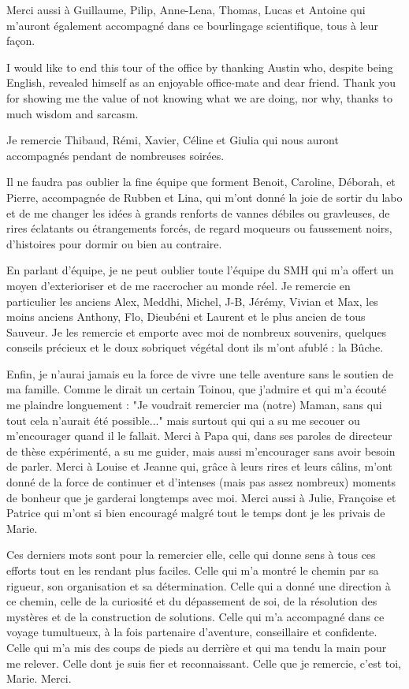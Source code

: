 \documentclass[a4paper, notoc, justified,marginals=left, nobib]{tufte-book}
\begin{document}
\begin{fullwidth}
Merci aussi à Guillaume, Pilip, Anne-Lena, Thomas, Lucas et Antoine qui m'auront également accompagné dans ce bourlingage scientifique, tous à leur façon.

I would like to end this tour of the office by thanking Austin who, despite being English, revealed himself as an enjoyable office-mate and dear friend. Thank you for showing me the value of not knowing what we are doing, nor why, thanks to much wisdom and sarcasm.

Je remercie Thibaud, Rémi, Xavier, Céline et Giulia qui  nous auront accompagnés pendant de nombreuses soirées.

Il ne faudra pas oublier la fine équipe que forment Benoit, Caroline, Déborah, et Pierre, accompagnée de Rubben et Lina, qui m'ont donné la joie de sortir du labo et de me changer les idées à grands renforts de vannes débiles ou gravleuses, de rires éclatants ou étrangements forcés, de regard moqueurs ou faussement noirs, d'histoires pour dormir ou bien au contraire.

En parlant d'équipe, je ne peut oublier toute l'équipe du SMH qui m'a offert un moyen d'exterioriser et de me raccrocher au monde réel. Je remercie en particulier les anciens Alex, Meddhi, Michel, J-B, Jérémy, Vivian et Max, les moins anciens Anthony, Flo, Dieubéni et Laurent et le plus ancien de tous Sauveur. Je les remercie et emporte avec moi de nombreux souvenirs, quelques conseils précieux et le doux sobriquet végétal dont ils m'ont afublé : la Bûche.

Enfin, je n'aurai jamais eu la force de vivre une telle aventure sans le soutien de ma famille. Comme le dirait un certain Toinou, que j'admire et qui m'a écouté me plaindre longuement : "Je voudrait remercier ma (notre) Maman, sans qui tout cela n'aurait été possible..." mais  surtout qui qui a su me secouer ou m'encourager quand il le fallait. Merci à Papa qui, dans ses paroles de directeur de thèse expérimenté, a su me guider, mais aussi m'encourager sans avoir besoin de parler. Merci à Louise et Jeanne qui, grâce à leurs rires et leurs câlins, m'ont donné de la force de continuer et d'intenses (mais pas assez nombreux) moments de bonheur que je garderai longtemps avec moi. Merci aussi à Julie, Françoise et Patrice qui m'ont si bien encouragé malgré tout le temps dont je les privais de Marie.

Ces derniers mots sont pour la remercier elle, celle qui donne sens à tous ces efforts tout en les rendant plus faciles. Celle qui m'a montré le chemin par sa rigueur, son organisation et sa détermination. Celle qui a donné une direction à ce chemin, celle de la curiosité et du dépassement de soi, de la résolution des mystères et de la construction de solutions. Celle qui m'a accompagné dans ce voyage tumultueux, à la fois partenaire d'aventure, conseillaire et confidente. Celle qui m'a mis des coups de pieds au derrière et qui ma tendu la main pour me relever. Celle dont je suis fier et reconnaissant. Celle que je remercie, c'est toi, Marie. Merci.


\end{fullwidth}
\end{document}

